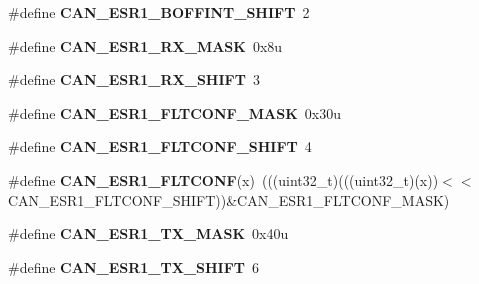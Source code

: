 \begin{DoxyCompactItemize}
\item 
\#define {\bfseries C\+A\+N\+\_\+\+E\+S\+R1\+\_\+\+B\+O\+F\+F\+I\+N\+T\+\_\+\+S\+H\+I\+FT}~2\hypertarget{group__CAN__Register__Masks_ga5e04e60e6627e38eaf02023308703a2e}{}\label{group__CAN__Register__Masks_ga5e04e60e6627e38eaf02023308703a2e}

\item 
\#define {\bfseries C\+A\+N\+\_\+\+E\+S\+R1\+\_\+\+R\+X\+\_\+\+M\+A\+SK}~0x8u\hypertarget{group__CAN__Register__Masks_ga246ad2ff9dd50d1d6b931b5e42ef90b3}{}\label{group__CAN__Register__Masks_ga246ad2ff9dd50d1d6b931b5e42ef90b3}

\item 
\#define {\bfseries C\+A\+N\+\_\+\+E\+S\+R1\+\_\+\+R\+X\+\_\+\+S\+H\+I\+FT}~3\hypertarget{group__CAN__Register__Masks_ga5f5f765579cea7bfb561f84e62b96623}{}\label{group__CAN__Register__Masks_ga5f5f765579cea7bfb561f84e62b96623}

\item 
\#define {\bfseries C\+A\+N\+\_\+\+E\+S\+R1\+\_\+\+F\+L\+T\+C\+O\+N\+F\+\_\+\+M\+A\+SK}~0x30u\hypertarget{group__CAN__Register__Masks_ga6c81fa9d3bec21a97a304319968216a8}{}\label{group__CAN__Register__Masks_ga6c81fa9d3bec21a97a304319968216a8}

\item 
\#define {\bfseries C\+A\+N\+\_\+\+E\+S\+R1\+\_\+\+F\+L\+T\+C\+O\+N\+F\+\_\+\+S\+H\+I\+FT}~4\hypertarget{group__CAN__Register__Masks_gadb93c702b83c1240d7b1a07fba1b33a3}{}\label{group__CAN__Register__Masks_gadb93c702b83c1240d7b1a07fba1b33a3}

\item 
\#define {\bfseries C\+A\+N\+\_\+\+E\+S\+R1\+\_\+\+F\+L\+T\+C\+O\+NF}(x)~(((uint32\+\_\+t)(((uint32\+\_\+t)(x))$<$$<$C\+A\+N\+\_\+\+E\+S\+R1\+\_\+\+F\+L\+T\+C\+O\+N\+F\+\_\+\+S\+H\+I\+FT))\&C\+A\+N\+\_\+\+E\+S\+R1\+\_\+\+F\+L\+T\+C\+O\+N\+F\+\_\+\+M\+A\+SK)\hypertarget{group__CAN__Register__Masks_ga280fd558442e907a131d0156629c9a9c}{}\label{group__CAN__Register__Masks_ga280fd558442e907a131d0156629c9a9c}

\item 
\#define {\bfseries C\+A\+N\+\_\+\+E\+S\+R1\+\_\+\+T\+X\+\_\+\+M\+A\+SK}~0x40u\hypertarget{group__CAN__Register__Masks_ga29052f7ad6fc3da4cbcd9dce8ffa59f5}{}\label{group__CAN__Register__Masks_ga29052f7ad6fc3da4cbcd9dce8ffa59f5}

\item 
\#define {\bfseries C\+A\+N\+\_\+\+E\+S\+R1\+\_\+\+T\+X\+\_\+\+S\+H\+I\+FT}~6\hypertarget{group__CAN__Register__Masks_ga054c570f7af7ef5b09d3d5f5b3edaa3e}{}\label{group__CAN__Register__Masks_ga054c570f7af7ef5b09d3d5f5b3edaa3e}


\end{DoxyCompactItemize}
